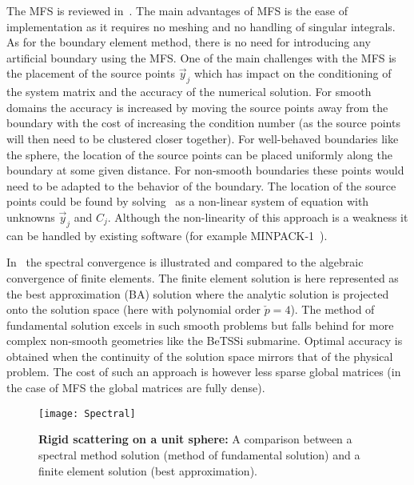 The MFS is reviewed in~\cite{Fairweather2003tmo}. The main advantages of MFS is the ease of implementation as it requires no meshing and no handling of singular integrals. As for the boundary element method, there is no need for introducing any artificial boundary using the MFS. One of the main challenges with the MFS is the placement of the source points $\vec{y}_j$ which has impact on the conditioning of the system matrix and the accuracy of the numerical solution. For smooth domains the accuracy is increased by moving the source points away from the boundary with the cost of increasing the condition number (as the source points will then need to be clustered closer together). For well-behaved boundaries like the sphere, the location of the source points can be placed uniformly along the boundary at some given distance. For non-smooth boundaries these points would need to be adapted to the behavior of the boundary. The location of the source points could be found by solving~ as a non-linear system of equation with unknowns $\vec{y}_j$ and $C_j$. Although the non-linearity of this approach is a weakness it can be handled by existing software (for example MINPACK-1~\cite{More1980ugf}).

In~ the spectral convergence is illustrated and compared to the algebraic convergence of finite elements. The finite element solution is here represented as the best approximation (BA) solution where the analytic solution is projected onto the solution space (here with polynomial order $\check{p}=4$). The method of fundamental solution excels in such smooth problems but falls behind for more complex non-smooth geometries like the BeTSSi submarine. Optimal accuracy is obtained when the continuity of the solution space mirrors that of the physical problem. The cost of such an approach is however less sparse global matrices (in the case of MFS the global matrices are fully dense).
\begin{figure}
	\centering
	\texttt{[image: Spectral]}
	\caption{\textbf{Rigid scattering on a unit sphere:} A comparison between a spectral method solution (method of fundamental solution) and a finite element solution (best approximation).}
	\label{Fig:Spectral}
\end{figure}

